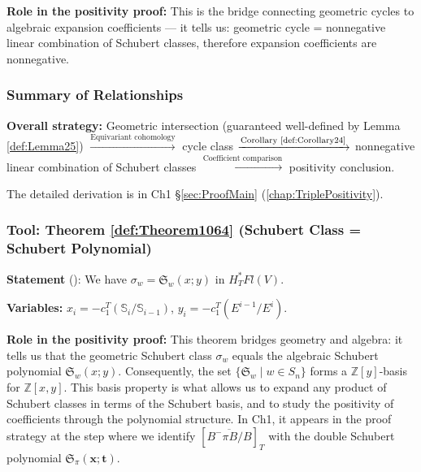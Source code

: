 \textbf{Role in the positivity proof:} This is the bridge connecting geometric cycles to algebraic expansion coefficients --- it tells us: geometric cycle = nonnegative linear combination of Schubert classes, therefore expansion coefficients are nonnegative.\ 

\subsubsection{Summary of Relationships}
\label{sec:Ch1RelationshipsSummary}

\begin{center}
\end{center}

\textbf{Overall strategy:} Geometric intersection (guaranteed well-defined by Lemma \cref{def:Lemma25}) \(\xrightarrow{\text{Equivariant cohomology}}\) cycle class \(\xrightarrow{\text{Corollary \cref{def:Corollary24}}}\) nonnegative linear combination of Schubert classes \(\xrightarrow{\text{Coefficient comparison}}\) positivity conclusion.

The detailed derivation is in Ch1 \S\ref{sec:ProofMain} (\cref{chap:TriplePositivity}).
\subsubsection{Tool: Theorem \ref{def:Theorem1064} (Schubert Class = Schubert Polynomial)}
\label{sec:Theorem1064Detail}

\textbf{Statement} (\cite[Theorem 10.6.4]{AndersonFulton}): We have $\sigma_w = \mathfrak{S}_w(x;y)$ in $H_T^* Fl(V)$.

\textbf{Variables:} $x_i = -c_1^T(\mathbb{S}_i/\mathbb{S}_{i-1})$, $y_i = -c_1^T(E^{i-1}/E^i)$.

\textbf{Role in the positivity proof:} This theorem bridges geometry and algebra: it tells us that the geometric Schubert class $\sigma_w$ equals the algebraic Schubert polynomial $\mathfrak{S}_w(x;y)$. Consequently, the set $\{\mathfrak{S}_w \mid w \in S_n\}$ forms a $\mathbb{Z}[y]$-basis for $\mathbb{Z}[x,y]$. This basis property is what allows us to expand any product of Schubert classes in terms of the Schubert basis, and to study the positivity of coefficients through the polynomial structure. In Ch1, it appears in the proof strategy at the step where we identify $[\overline{B^-\pi B/B}]_T$ with the double Schubert polynomial $\mathfrak{S}_\pi(\mathbf{x};\mathbf{t})$.

